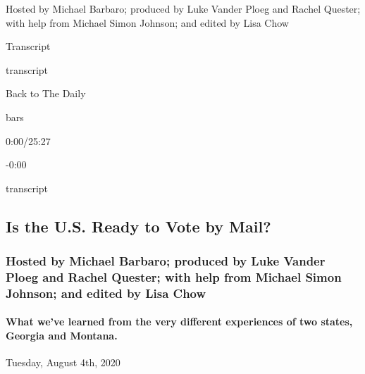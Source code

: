 Hosted by Michael Barbaro; produced by Luke Vander Ploeg and Rachel
Quester; with help from Michael Simon Johnson; and edited by Lisa Chow

Transcript

transcript

Back to The Daily

bars

0:00/25:27

-0:00

transcript

\hypertarget{is-the-us-ready-to-vote-by-mail-2}{%
\subsection{Is the U.S. Ready to Vote by
Mail?}\label{is-the-us-ready-to-vote-by-mail-2}}

\hypertarget{hosted-by-michael-barbaro-produced-by-luke-vander-ploeg-and-rachel-quester-with-help-from-michael-simon-johnson-and-edited-by-lisa-chow-1}{%
\subsubsection{Hosted by Michael Barbaro; produced by Luke Vander Ploeg
and Rachel Quester; with help from Michael Simon Johnson; and edited by
Lisa
Chow}\label{hosted-by-michael-barbaro-produced-by-luke-vander-ploeg-and-rachel-quester-with-help-from-michael-simon-johnson-and-edited-by-lisa-chow-1}}

\hypertarget{what-weve-learned-from-the-very-different-experiences-of-two-states-georgia-and-montana-2}{%
\paragraph{What we've learned from the very different experiences of two
states, Georgia and
Montana.}\label{what-weve-learned-from-the-very-different-experiences-of-two-states-georgia-and-montana-2}}

Tuesday, August 4th, 2020

